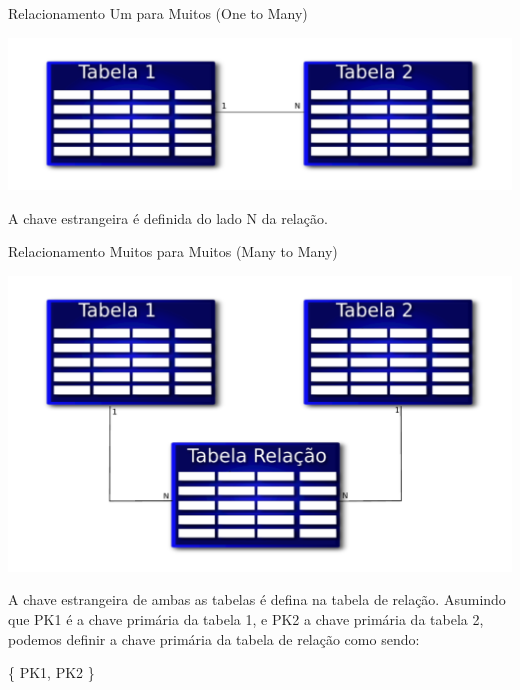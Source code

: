 \documentclass[xcolor=x11names,compress]{beamer}
\begin{document}
\begin{frame}{Relacionamento Um para Muitos (One to Many)}

\begin{center}
\includegraphics[keepaspectratio,width=\textwidth]{relation_one_to_many}
\end{center}

\begin{block}{}
\centering A chave estrangeira é definida do lado N da relação.
\end{block}

\end{frame}

\begin{frame}{Relacionamento Muitos para Muitos (Many to Many)}

\begin{center}
\includegraphics[keepaspectratio,width=.6\textwidth]{relation_many_to_many}
\end{center}

\begin{block}{}

\centering A chave estrangeira de ambas as tabelas é defina na tabela de relação. Asumindo que PK1 é a chave primária da tabela 1, e PK2 a chave primária da tabela 2, podemos definir a chave primária da tabela de relação como sendo:

 \centering \{ PK1, PK2 \}
\end{block}

\end{frame}
\end{document}
